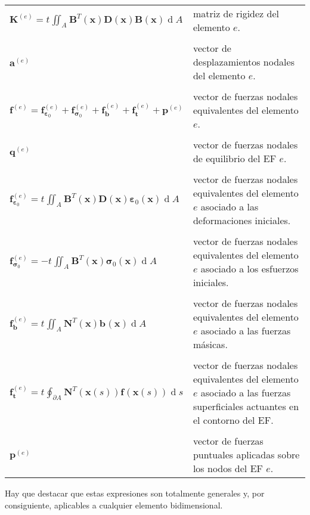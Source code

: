 \documentclass[12pt,letterpaper, landscape]{article}
\newcommand{\e}{{}}
\newcommand{\ve}[1]{{\boldsymbol{#1}}}
\newcommand{\ma}[1]{{\boldsymbol{#1}}}
\newcommand{\dd}{\operatorname{d} \!}
\begin{document}
\begin{tabular}{lp{14.2cm}}
   $\displaystyle \ma{K}^{(e)} = t^\e \iint_{A^\e}  \ma{B}^T(\ve{x})\ma{D}(\ve{x})\ma{B}(\ve{x}) \dd A$ & matriz de rigidez del elemento $e$.\\
   \\[-1ex]
   $\ve{a}^{(e)}$ & vector de desplazamientos nodales del elemento $e$.\\
   \\[-1ex]
   $\ma{f}^{(e)} = \ve{f}_{\ve{\varepsilon}_0}^{(e)} + \ve{f}_{\ve{\sigma}_0}^{(e)} + \ve{f}^{(e)}_\ve{b} + \ve{f}^{(e)}_\ve{t} + \ve{p}^{(e)}$     &  vector de fuerzas nodales equivalentes del elemento $e$.\\
   \\[-1ex]
   $\ve{q}^{(e)}$ & vector de fuerzas nodales de equilibrio del EF $e$.\\   
   \\[-1ex]
   $\displaystyle\ve{f}^{(e)}_{\ve{\varepsilon}_0} = t^\e \iint_{A^\e}  \ma{B}^T(\ve{x})\ma{D}(\ve{x})\ve{\varepsilon}_0(\ve{x}) \dd A$      & vector de fuerzas nodales equivalentes del elemento $e$ asociado a las deformaciones iniciales.\\
   \\[-1ex]   
   $\displaystyle \ve{f}^{(e)}_{\ve{\sigma}_0} = -t^\e \iint_{A^\e}  \ma{B}^T(\ve{x})\ve{\sigma}_0(\ve{x}) \dd A$ &vector de fuerzas nodales equivalentes del elemento $e$ asociado a los esfuerzos iniciales.\\
   \\[-1ex]
   $\displaystyle \ve{f}^{(e)}_\ve{b} = t^\e \iint_{A^\e}  \ma{N}^T(\ve{x}) \ve{b}^\e(\ve{x}) \dd A$ &vector de fuerzas nodales equivalentes del elemento $e$ asociado a las fuerzas másicas.\\
   \\[-1ex]
   $\displaystyle \ve{f}^{(e)}_\ve{t} = t^\e \oint_{\partial A^\e} \ma{N}^T(\ve{x}(s)) \ve{f}^\e(\ve{x}(s)) \dd s$ &vector de fuerzas nodales equivalentes del elemento $e$ asociado a las fuerzas superficiales actuantes en el contorno del EF.\\
\\[-1ex]   
   $\ve{p}^{(e)}$       & vector de fuerzas puntuales aplicadas sobre los nodos del EF $e$.
\end{tabular} 

\vspace{\baselineskip}\vspace{\baselineskip}
Hay que destacar que estas expresiones son totalmente generales y, por consiguiente, aplicables a cualquier elemento bidimensional.
\end{document}
